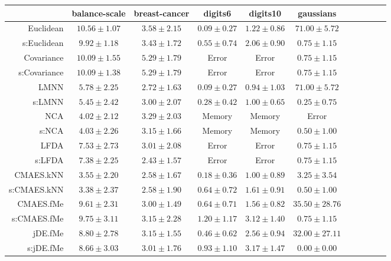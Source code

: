 \begin{table}[ht] \centering
{\small\renewcommand{\arraystretch}{0.95}
\setlength{\tabcolsep}{1pt}
\begin{tabular}{rcccccccccc}
\toprule


& \multicolumn{1}{c}{balance-scale} & \multicolumn{1}{c}{breast-cancer} & \multicolumn{1}{c}{digits6} & \multicolumn{1}{c}{digits10} & \multicolumn{1}{c}{gaussians} \\ 
\midrule
Euclidean & $10.56\pm1.07$ & $3.58\pm2.15$ & $\bm{0.09\pm0.27}$ & $1.22\pm0.86$ & $71.00\pm5.72$ \\
s:Euclidean & $9.92\pm1.18$ & $3.43\pm1.72$ & $0.55\pm0.74$ & $2.06\pm0.90$ & $0.75\pm1.15$ \\
Covariance & $10.09\pm1.55$ & $5.29\pm1.79$ & Error  & Error  & $0.75\pm1.15$ \\
s:Covariance & $10.09\pm1.38$ & $5.29\pm1.79$ & Error  & Error  & $0.75\pm1.15$ \\
LMNN & $5.78\pm2.25$ & $2.72\pm1.63$ & $\bm{0.09\pm0.27}$ & $\bm{0.94\pm1.03}$ & $71.00\pm5.72$ \\
s:LMNN & $5.45\pm2.42$ & $3.00\pm2.07$ & $0.28\pm0.42$ & $1.00\pm0.65$ & $0.25\pm0.75$ \\
NCA & $4.02\pm2.12$ & $3.29\pm2.03$ & Memory  & Memory  & Error  \\
s:NCA & $4.03\pm2.26$ & $3.15\pm1.66$ & Memory  & Memory  & $0.50\pm1.00$ \\
LFDA & $7.53\pm2.73$ & $3.01\pm2.08$ & Error  & Error  & $0.75\pm1.15$ \\
s:LFDA & $7.38\pm2.25$ & $\bm{2.43\pm1.57}$ & Error  & Error  & $0.75\pm1.15$ \\
CMAES.kNN & $3.55\pm2.20$ & $2.58\pm1.67$ & $0.18\pm0.36$ & $1.00\pm0.89$ & $3.25\pm3.54$ \\
s:CMAES.kNN & $\bm{3.38\pm2.37}$ & $2.58\pm1.90$ & $0.64\pm0.72$ & $1.61\pm0.91$ & $0.50\pm1.00$ \\
CMAES.fMe & $9.61\pm2.31$ & $3.00\pm1.49$ & $0.64\pm0.71$ & $1.56\pm0.82$ & $35.50\pm28.76$ \\
s:CMAES.fMe & $9.75\pm3.11$ & $3.15\pm2.28$ & $1.20\pm1.17$ & $3.12\pm1.40$ & $0.75\pm1.15$ \\
jDE.fMe & $8.80\pm2.78$ & $3.15\pm1.55$ & $0.46\pm0.62$ & $2.56\pm0.94$ & $32.00\pm27.11$ \\
s:jDE.fMe & $8.66\pm3.03$ & $3.01\pm1.76$ & $0.93\pm1.10$ & $3.17\pm1.47$ & $\bm{0.00\pm0.00}$ \\

\end{tabular}}
\end{table}
